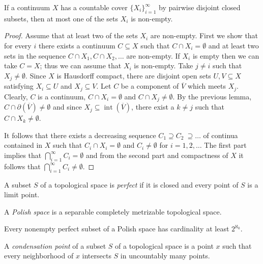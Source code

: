 \documentclass[letterpaper,11pt]{report}
\DeclareMathOperator{\inter}{int}
\begin{document}
\begin{thm} If a continuum $X$ has a countable cover $\{X_i\}_{i=1}^{\infty}$ by pairwise disjoint closed subsets, then at most one of the sets $X_i$ is non-empty.
\end{thm}
\begin{proof} Assume that at least two of the sets $X_i$ are non-empty. First we show that for every $i$ there exists a continuum $C \subseteq X$ such that $ C \cap X_i = \emptyset$ and at least two sets in the sequence $C \cap X_1, C \cap X_2, \ldots$ are non-empty. If $X_i$ is empty then we can take $C = X$; thus we can assume that $X_i$ is non-empty. Take $j \ne i$ such that $X_j \ne \emptyset$. Since $X$ is Hausdorff compact, there are disjoint open sets $U,V \subseteq X$ satisfying $X_i \subseteq U$ and $X_j \subseteq V$. Let $C$ be a component of $\overline{V}$ which meets $X_j$. Clearly, $C$ is a continuum, $C \cap X_i = \emptyset$ and $C \cap X_j \ne \emptyset$. By the previous lemma, $C \cap \partial (\overline{V}) \ne \emptyset$ and since $X_j \subseteq \inter(\overline{V})$, there exist a $k \ne j$ such that $C \cap X_k \ne \emptyset$.

It follows that there exists a decreasing sequence $C_1 \supseteq C_2 \ \supseteq \ldots$ of continua contained in $X$ such that $C_i \cap X_i = \emptyset$ and $C_i \ne \emptyset$ for $i=1,2, \ldots$ The first part implies that $\bigcap_{i=1}^{\infty} C_i = \emptyset$ and from the second part and compactness of $X$ it follows that $\bigcap_{i=1}^{\infty} C_i \ne \emptyset$.
\end{proof}

\begin{defn} A subset $S$ of a topological space is \emph{perfect} if it is closed and every point of $S$ is a limit point.
\end{defn}

\begin{defn} A \emph{Polish space} is a separable completely metrizable topological space.
\end{defn}

\begin{thm}[Cantor] Every nonempty perfect subset of a Polish space has cardinality at least $2^{\aleph_0}$.
\end{thm}

\begin{defn} A \emph{condensation point} of a subset $S$ of a topological space is a point $x$ such that every neighborhood of $x$ intersects $S$ in uncountably many points.
\end{defn}
\end{document}
